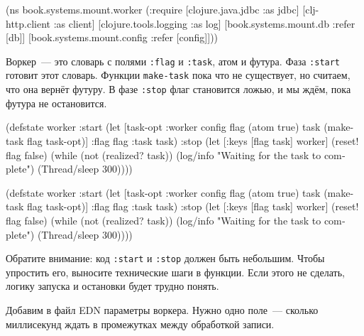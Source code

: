 \else

\begin{english}
  \begin{clojure}
(ns book.systems.mount.worker
  (:require
   [clojure.java.jdbc :as jdbc]
   [clj-http.client :as client]
   [clojure.tools.logging :as log]
   [book.systems.mount.db :refer [db]]
   [book.systems.mount.config :refer [config]]))
  \end{clojure}
\end{english}

\fi

Воркер~--- это словарь с полями \verb|:flag| и \verb|:task|, атом и футура. Фаза
\verb|:start| готовит этот словарь. Функции \verb|make-task| пока что не
существует, но считаем, что она вернёт футуру. В фазе \verb|:stop| флаг
становится ложью, и мы ждём, пока футура не остановится.


\ifnarrow

\begin{english}
  \begin{clojure}
(defstate worker
  :start
  (let [{task-opt :worker} config
        flag (atom true)
        task (make-task flag task-opt)]
    {:flag flag :task task})
  :stop
  (let [{:keys [flag task]} worker]
    (reset! flag false)
    (while (not (realized? task))
      (log/info
      "Waiting for the task
                to complete")
      (Thread/sleep 300))))
  \end{clojure}
\end{english}

\else

\begin{english}
  \begin{clojure}
(defstate worker
  :start
  (let [{task-opt :worker} config
        flag (atom true)
        task (make-task flag task-opt)]
    {:flag flag :task task})
  :stop
  (let [{:keys [flag task]} worker]
    (reset! flag false)
    (while (not (realized? task))
      (log/info "Waiting for the task to complete")
      (Thread/sleep 300))))
  \end{clojure}
\end{english}

\fi

Обратите внимание: код \verb|:start| и \verb|:stop| должен быть небольшим. Чтобы
упростить его, выносите технические шаги в функции. Если этого не сделать,
логику запуска и остановки будет трудно понять.

Добавим в файл EDN параметры воркера. Нужно одно поле~--- сколько миллисекунд
ждать в промежутках между обработкой записи.

